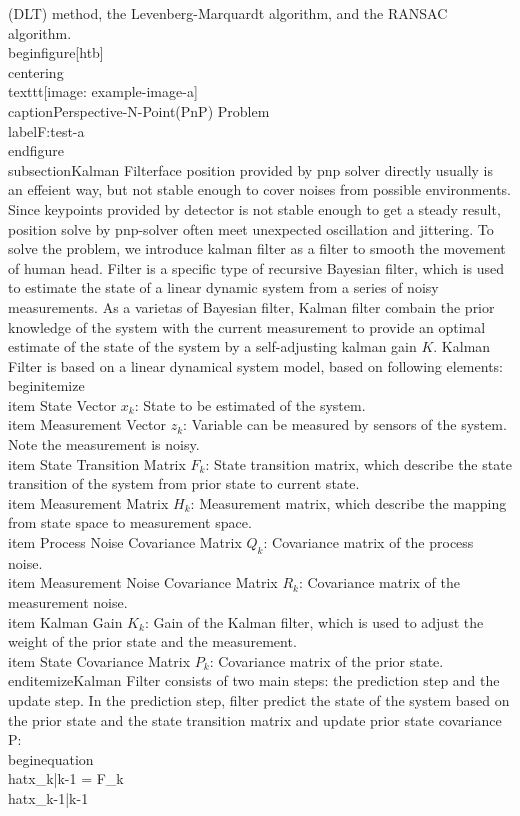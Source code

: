  (DLT) method, the Levenberg-Marquardt algorithm, and the RANSAC algorithm. \n\n\\begin{figure}[htb]\n    \\centering\n    \\texttt{[image: example-image-a]}\n    \\caption{Perspective-N-Point(PnP) Problem}\\label{F:test-a}\n\\end{figure}\n\n\n\\subsection{Kalman Filter}\nUsing face position provided by pnp solver directly usually is an effeient way, but not stable enough to cover noises from possible environments.  Since keypoints provided by detector is not stable enough to get a steady result, position solve by pnp-solver often meet unexpected oscillation and jittering. To solve the problem, we introduce kalman filter as a filter to smooth the movement of human head. \n\nKalman Filter is a specific type of recursive Bayesian filter, which is used to estimate the state of a linear dynamic system from a series of noisy measurements. As a varietas of Bayesian filter, Kalman filter combain the prior knowledge of the system with the current measurement to provide an optimal estimate of the state of the system by a self-adjusting kalman gain $K$. \n\nThe Kalman Filter is based on a linear dynamical system model, based on following elements:\n\\begin{itemize}\n    \\item State Vector $x_k$: State to be estimated of the  system.\n    \\item Measurement Vector $z_k$: Variable can be measured by sensors of the system. Note the measurement is noisy.\n    \\item State Transition Matrix $F_k$: State transition matrix, which describe the state transition of the system from prior state to current state.\n    \\item Measurement Matrix $H_k$: Measurement matrix, which describe the mapping from state space to measurement space.\n    \\item Process Noise Covariance Matrix $Q_k$: Covariance matrix of the process noise.\n    \\item Measurement Noise Covariance Matrix $R_k$: Covariance matrix of the measurement noise.\n    \\item Kalman Gain $K_k$: Gain of the Kalman filter, which is used to adjust the weight of the prior state and the measurement.\n    \\item State Covariance Matrix $P_k$: Covariance matrix of the prior state.\n\\end{itemize}\n\nThe Kalman Filter consists of two main steps: the prediction step and the update step. In the prediction step, filter predict the state of the system based on the prior state and the state transition matrix and update prior state covariance P:\n\\begin{equation}\n    \\hat{x}_{k|k-1} = F_k \\hat{x}_{k-1|k-1} 